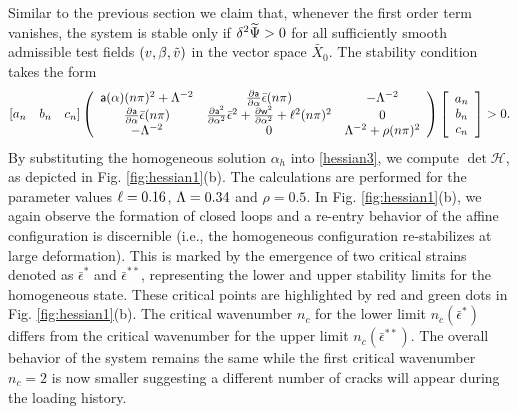 Similar to the previous section we claim that, whenever the first order term vanishes, the system is stable only if $\delta^2 \widetilde\Psi
>0$ for all sufficiently smooth admissible test fields $(v, \beta, \tilde v)$ in the vector space $\widetilde{ X_0}$. The stability condition  takes the form
\begin{align}
    \left[ a_n \quad b_n \quad c_n \right]\left(
\begin{array}{ccc}
\mathsf{a}(\alpha)(n\pi)^2+\Lambda^{-2}& \frac{\partial \mathsf{a}}{\partial \alpha}\bar\epsilon(n\pi) &  -\Lambda^{-2} \\
\frac{\partial \mathsf{a}}{\partial \alpha}\bar\epsilon(n\pi) & \frac{\partial \mathsf{a}^2}{\partial \alpha^2}\bar\epsilon^2+ \frac{\partial \mathsf{w}^2}{\partial \alpha^2}+\ell^2(n\pi)^2 & 0 \\
 -\Lambda^{-2} & 0 & \Lambda^{-2} +\rho (n\pi)^2\\
\end{array}
\right)\left[ \begin{array}{c} a_n \\ b_n \\c_n \end{array} \right]>0.\label{hessian3}\end{align}
By substituting the homogeneous solution $\alpha_h$ into \eqref{hessian3}, we compute $\det \mathcal{H}$, as depicted  in Fig. \ref{fig:hessian1}(b). The calculations are performed for the parameter values $\ell=0.16$, $\Lambda=0.34$ and $\rho=0.5$.  In Fig. \ref{fig:hessian1}(b), we again observe the formation of closed loops and a re-entry behavior of the affine configuration is discernible  (i.e., the homogeneous configuration re-stabilizes at large deformation). This is marked by the emergence of two critical strains denoted as $\bar\epsilon^*$ and $\bar\epsilon^{**}$, representing the lower and upper stability limits for the homogeneous state. These critical points are highlighted by red and green dots in Fig. \ref{fig:hessian1}(b). The critical wavenumber $n_c$ for the lower limit $n_c(\bar{\epsilon}^*)$    differs from the critical wavenumber for the upper limit $n_c(\bar{\epsilon}^{**})$. The overall behavior of the system remains the same while the first critical wavenumber $n_c=2$ is now smaller suggesting a different number of cracks will appear during the loading history.




